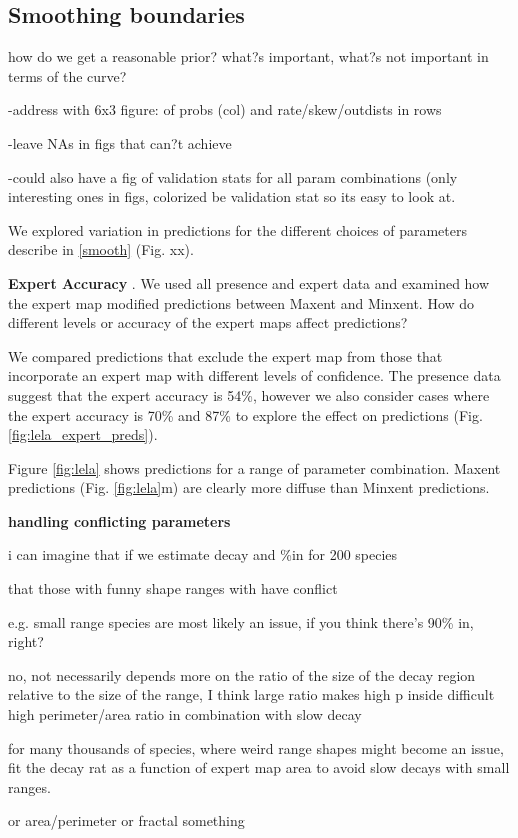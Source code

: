\subsection{Smoothing boundaries}


how do we get a reasonable prior? what?s important, what?s not important in terms of the curve?
	
	-address with 6x3 figure: of probs (col) and rate/skew/outdists in rows
	
		-leave NAs in figs that can?t achieve
	
	-could also have a fig of validation stats for all param combinations (only interesting ones in figs, colorized be validation stat so its easy to look at.


We explored variation in predictions for the different choices of parameters describe in \ref{smooth} (Fig. xx).


\textbf{Expert Accuracy} . We used all presence and expert data and examined how the expert map modified predictions between Maxent and Minxent. How do different levels or accuracy of the expert maps affect predictions? 


We compared predictions that exclude the expert map from those that incorporate an expert map with different levels of confidence. The presence data suggest that the expert accuracy is 54\%, however we also consider cases where the expert accuracy is 70\% and 87\% to explore the effect on predictions (Fig.\ref{fig:lela_expert_preds}). 


Figure \ref{fig:lela} shows predictions for a range of parameter combination. Maxent predictions (Fig. \ref{fig:lela}m) are clearly more diffuse than Minxent predictions. 


\textbf{handling conflicting parameters} 

i can imagine that if we estimate decay and \%in for 200 species


that those with funny shape ranges with have conflict


e.g. small range species are most likely an issue, if you think there's 90\% in, right?


no, not necessarily
depends more on the ratio of the size of the decay region relative to the size of the range, I think
large ratio makes high p inside difficult
high perimeter/area ratio
in combination with slow decay


for many thousands of species, where weird range shapes might become an issue,  fit the decay rat as a function of expert map area to avoid slow decays with small ranges.


or area/perimeter or fractal something
